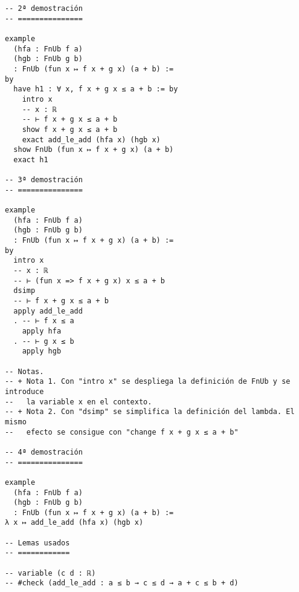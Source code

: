 \begin{verbatim}
-- 2ª demostración
-- ===============

example
  (hfa : FnUb f a)
  (hgb : FnUb g b)
  : FnUb (fun x ↦ f x + g x) (a + b) :=
by
  have h1 : ∀ x, f x + g x ≤ a + b := by
    intro x
    -- x : ℝ
    -- ⊢ f x + g x ≤ a + b
    show f x + g x ≤ a + b
    exact add_le_add (hfa x) (hgb x)
  show FnUb (fun x ↦ f x + g x) (a + b)
  exact h1

-- 3ª demostración
-- ===============

example
  (hfa : FnUb f a)
  (hgb : FnUb g b)
  : FnUb (fun x ↦ f x + g x) (a + b) :=
by
  intro x
  -- x : ℝ
  -- ⊢ (fun x => f x + g x) x ≤ a + b
  dsimp
  -- ⊢ f x + g x ≤ a + b
  apply add_le_add
  . -- ⊢ f x ≤ a
    apply hfa
  . -- ⊢ g x ≤ b
    apply hgb

-- Notas.
-- + Nota 1. Con "intro x" se despliega la definición de FnUb y se introduce
--   la variable x en el contexto.
-- + Nota 2. Con "dsimp" se simplifica la definición del lambda. El mismo
--   efecto se consigue con "change f x + g x ≤ a + b"

-- 4ª demostración
-- ===============

example
  (hfa : FnUb f a)
  (hgb : FnUb g b)
  : FnUb (fun x ↦ f x + g x) (a + b) :=
λ x ↦ add_le_add (hfa x) (hgb x)

-- Lemas usados
-- ============

-- variable (c d : ℝ)
-- #check (add_le_add : a ≤ b → c ≤ d → a + c ≤ b + d)
\end{verbatim}

